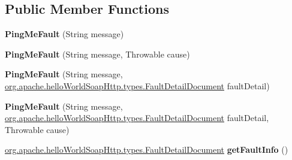 \subsection*{Public Member Functions}
\begin{DoxyCompactItemize}
\item 
\hypertarget{classorg_1_1apache_1_1hello__world__soap__http_1_1_ping_me_fault_a29e5f00cbbc4e58139880a4930f0b468}{}{\bfseries Ping\+Me\+Fault} (String message)\label{classorg_1_1apache_1_1hello__world__soap__http_1_1_ping_me_fault_a29e5f00cbbc4e58139880a4930f0b468}

\item 
\hypertarget{classorg_1_1apache_1_1hello__world__soap__http_1_1_ping_me_fault_a5b64382af6d35fd60eb171291c2ea9ad}{}{\bfseries Ping\+Me\+Fault} (String message, Throwable cause)\label{classorg_1_1apache_1_1hello__world__soap__http_1_1_ping_me_fault_a5b64382af6d35fd60eb171291c2ea9ad}

\item 
\hypertarget{classorg_1_1apache_1_1hello__world__soap__http_1_1_ping_me_fault_a3903985bc990c9ce7cb640eae5e8ac11}{}{\bfseries Ping\+Me\+Fault} (String message, \hyperlink{interfaceorg_1_1apache_1_1hello_world_soap_http_1_1types_1_1_fault_detail_document}{org.\+apache.\+hello\+World\+Soap\+Http.\+types.\+Fault\+Detail\+Document} fault\+Detail)\label{classorg_1_1apache_1_1hello__world__soap__http_1_1_ping_me_fault_a3903985bc990c9ce7cb640eae5e8ac11}

\item 
\hypertarget{classorg_1_1apache_1_1hello__world__soap__http_1_1_ping_me_fault_af23cdaab54f390c070a32e2cab718f38}{}{\bfseries Ping\+Me\+Fault} (String message, \hyperlink{interfaceorg_1_1apache_1_1hello_world_soap_http_1_1types_1_1_fault_detail_document}{org.\+apache.\+hello\+World\+Soap\+Http.\+types.\+Fault\+Detail\+Document} fault\+Detail, Throwable cause)\label{classorg_1_1apache_1_1hello__world__soap__http_1_1_ping_me_fault_af23cdaab54f390c070a32e2cab718f38}

\item 
\hypertarget{classorg_1_1apache_1_1hello__world__soap__http_1_1_ping_me_fault_a3a9cc886ef1cd7a979623b427795c02a}{}\hyperlink{interfaceorg_1_1apache_1_1hello_world_soap_http_1_1types_1_1_fault_detail_document}{org.\+apache.\+hello\+World\+Soap\+Http.\+types.\+Fault\+Detail\+Document} {\bfseries get\+Fault\+Info} ()\label{classorg_1_1apache_1_1hello__world__soap__http_1_1_ping_me_fault_a3a9cc886ef1cd7a979623b427795c02a}

\end{DoxyCompactItemize}
